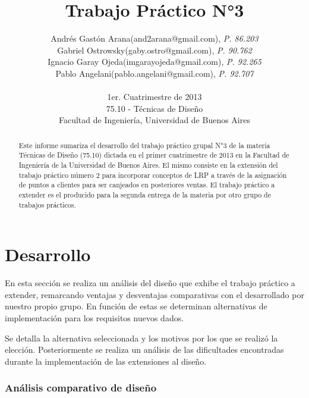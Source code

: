 \documentclass[a4paper,11pt]{article}
\title{\textbf{Trabajo Práctico N°3}}
\author{
  Andrés Gastón Arana(and2arana@gmail.com), \textit{P. 86.203}     \\
  Gabriel Ostrowsky(gaby.ostro@gmail.com), \textit{P. 90.762}       \\
  Ignacio Garay Ojeda(imgarayojeda@gmail.com), \textit{P. 92.265}   \\
  Pablo Angelani(pablo.angelani@gmail.com), \textit{P. 92.707}      \\
  \\
  \normalsize{1er. Cuatrimestre de 2013}                           \\
  \normalsize{75.10 - Técnicas de Diseño}                          \\
  \normalsize{Facultad de Ingeniería, Universidad de Buenos Aires}
}
\date{}
\begin{document}
\thispagestyle{empty}
\maketitle

\begin{abstract}

  Este informe sumariza el desarrollo del trabajo práctico grupal N°3 de la
  materia Técnicas de Diseño (75.10) dictada en el primer cuatrimestre de 2013
  en la Facultad de Ingeniería de la Universidad de Buenos Aires. El mismo
  consiste en la extensión del trabajo práctico número 2 para incorporar
  conceptos de LRP a través de la asignación de puntos a clientes para ser
  canjeados en posteriores ventas. El trabajo práctico a extender es el
  producido para la segunda entrega de la materia por otro grupo de trabajos
  prácticos.

\end{abstract}

\clearpage

\tableofcontents
\clearpage


\part{Desarrollo}

En esta sección se realiza un análisis del diseño que exhibe el trabajo
práctico a extender, remarcando ventajas y desventajas comparativas con el
desarrollado por nuestro propio grupo. En función de estas se determinan
alternativas de implementación para los requisitos nuevos dados.

Se detalla la alternativa seleccionada y los motivos por los que se realizó la
elección. Posteriormente se realiza un análisis de las dificultades encontradas
durante la implementación de las extensiones al diseño.

\section{Análisis comparativo de diseño}
\end{document}
